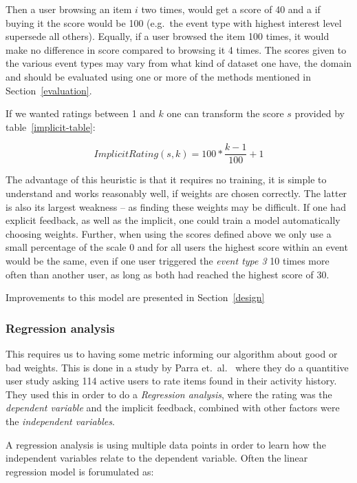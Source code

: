 Then a user browsing an item $i$ two times, would get a score of 40 and a if
buying it the score would be 100 (e.g.\ the event type with highest interest
level supersede all others). Equally, if a user browsed the item 100 times, it
would make no difference in score compared to browsing it 4 times. The scores
given to the various event types may vary from what kind of dataset one have,
the domain and should be evaluated using one or more of the methods mentioned
in Section~\ref{evaluation}.

If we wanted ratings between 1 and $k$ one can transform the score $s$ provided
by table~\ref{implicit-table}:

\begin{equation}
  ImplicitRating(s, k) = 100 * \frac{k-1}{100} + 1 
\end{equation}

The advantage of this heuristic is that it requires no training, it is simple
to understand and works reasonably well, if weights are chosen correctly.
The latter is also its largest weakness – as finding these weights may be
difficult. If one had explicit feedback, as well as the implicit, one could
train a model automatically choosing weights. Further, when using the scores
defined above we only use a small percentage of the scale 0 and for all
users the highest score within an event would be the same, even if one user
triggered the \textit{event type 3} 10 times more often than another user, as
long as both had reached the highest score of 30.

Improvements to this model are presented in Section~\ref{design}

\subsubsection{Regression analysis}

This requires us to having some metric informing our algorithm about good or
bad weights. This is done in a study by Parra et.\ al.~\cite{parra2011walk}
where they do a quantitive user study asking 114 active users to rate items
found in their activity history. They used this in order to do
a \textit{Regression analysis}, where the rating was the \textit{dependent
variable} and the implicit feedback, combined with other factors were the
\textit{independent variables}.

A regression analysis is using multiple data points in order to learn how the
independent variables relate to the dependent variable. Often the linear
regression model is forumulated as:

